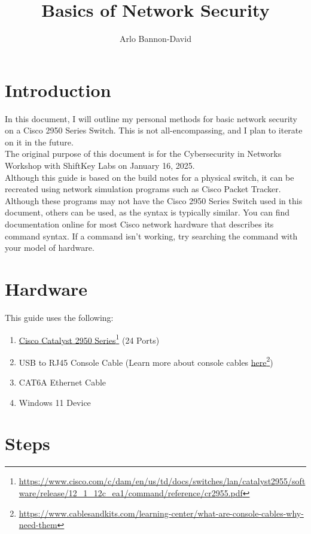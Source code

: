 \documentclass{ol-softwaremanual}
\title{Basics of Network Security}
\author{Arlo Bannon-David}
\newcommand{\doclink}[2]{\href{#1}{#2}\footnote{\url{#1}}}
\begin{document}
    \maketitle

    \tableofcontents

    \newpage

    \section{Introduction}\label{sec:introduction}

    In this document, I will outline my personal methods for basic network security on a Cisco 2950 Series Switch.
    This is not all-encompassing, and I plan to iterate on it in the future.\\

    The original purpose of this document is for the Cybersecurity in Networks Workshop with ShiftKey Labs on January 16, 2025.\\

    Although this guide is based on the build notes for a physical switch, it can be recreated using network simulation programs such as Cisco Packet Tracker. Although these programs may not have the Cisco 2950 Series Switch used in this document, others can be used, as the syntax is typically similar. You can find documentation online for most Cisco network hardware that describes its command syntax. If a command isn't working, try searching the command with your model of hardware.

    \section{Hardware}\label{sec:hardware}
    This guide uses the following:
    \begin{enumerate}
        \item \doclink{https://www.cisco.com/c/dam/en/us/td/docs/switches/lan/catalyst2955/software/release/12_1_12c_ea1/command/reference/cr2955.pdf}{Cisco Catalyst 2950 Series} (24 Ports)
        \item USB to RJ45 Console Cable (Learn more about console cables \doclink{https://www.cablesandkits.com/learning-center/what-are-console-cables-why-need-them}{here})
        \item CAT6A Ethernet Cable
        \item Windows 11 Device
    \end{enumerate}

    \section{Steps}\label{sec:steps}
\end{document}

